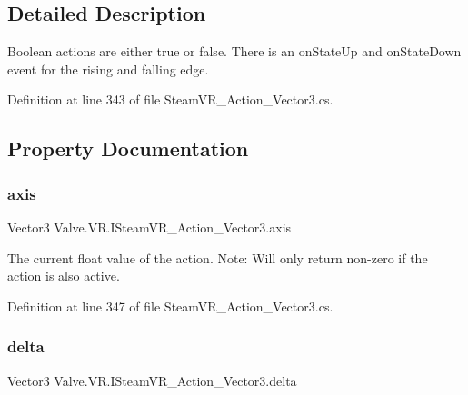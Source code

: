 \subsection{Detailed Description}
Boolean actions are either true or false. There is an on\+State\+Up and on\+State\+Down event for the rising and falling edge. 



Definition at line 343 of file Steam\+V\+R\+\_\+\+Action\+\_\+\+Vector3.\+cs.



\subsection{Property Documentation}
\mbox{\label{interface_valve_1_1_v_r_1_1_i_steam_v_r___action___vector3_ac416c306f1f927af2ab01c882839a8ce}} 
\subsubsection{\texorpdfstring{axis}{axis}}
{\footnotesize\ttfamily Vector3 Valve.\+V\+R.\+I\+Steam\+V\+R\+\_\+\+Action\+\_\+\+Vector3.\+axis\hspace{0.3cm}{\ttfamily [get]}}



The current float value of the action. Note\+: Will only return non-\/zero if the action is also active. 



Definition at line 347 of file Steam\+V\+R\+\_\+\+Action\+\_\+\+Vector3.\+cs.

\mbox{\label{interface_valve_1_1_v_r_1_1_i_steam_v_r___action___vector3_af6c10a846e313a404940b46a776265bb}} 
\subsubsection{\texorpdfstring{delta}{delta}}
{\footnotesize\ttfamily Vector3 Valve.\+V\+R.\+I\+Steam\+V\+R\+\_\+\+Action\+\_\+\+Vector3.\+delta\hspace{0.3cm}{\ttfamily [get]}}



